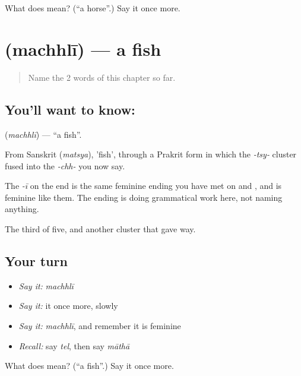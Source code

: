 \begin{tcolorbox}[breakable,colback=teal!4,colframe=teal!35!black,title={Before you move on}]
What does  mean? (\textquotedblleft{}a horse\textquotedblright{}.) Say it once more.
\end{tcolorbox}
\section[\texorpdfstring{\hi{मछली} (machhlī)}{मछली (machhlī)}]{ (machhlī) — a fish}

\label{lesson:HI-C54-fish}



\begin{quote}
Name the 2 words of this chapter so far.
\end{quote}

\subsection*{You'll want to know: }
\textbf{} (\emph{machhlī}) — \textquotedblleft{}a fish\textquotedblright{}.

From Sanskrit  (\emph{matsya}), 'fish', through a Prakrit form in which the \emph{-tsy-} cluster fused into the \emph{-chh-} you now say.

The \emph{-ī} on the end is the same feminine ending you have met on  and , and  is feminine like them. The ending is doing grammatical work here, not naming anything.

\begin{grammarlens}[title={What you've built}]
The third of five, and another cluster that gave way.
\end{grammarlens}

\subsection*{Your turn}
\begin{itemize}
\raggedright
  \item \emph{Say it:} \emph{machhlī}
  \item \emph{Say it:} it once more, slowly
  \item \emph{Say it:} \emph{machhlī}, and remember it is feminine
  \item \emph{Recall:} say \emph{tel}, then say \emph{māthā}
\end{itemize}

\begin{tcolorbox}[breakable,colback=teal!4,colframe=teal!35!black,title={Before you move on}]
What does  mean? (\textquotedblleft{}a fish\textquotedblright{}.) Say it once more.
\end{tcolorbox}
